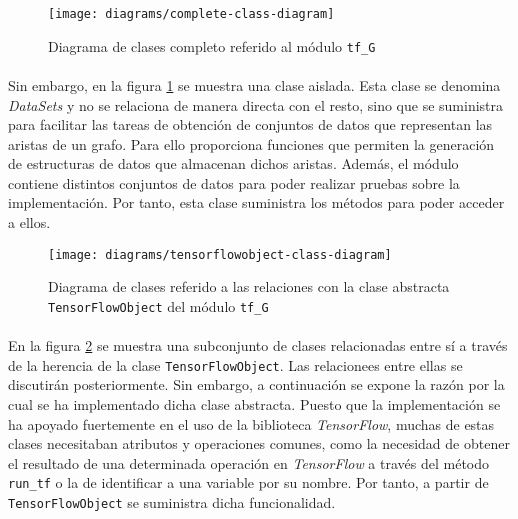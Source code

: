 \documentclass{subfiles}
\begin{document}
          \begin{figure}[h]
            \centering
            \texttt{[image: diagrams/complete-class-diagram]}
            \caption{Diagrama de clases completo referido al módulo \texttt{tf\_G}}
            \label{img:class_diagram}
          \end{figure}

          \paragraph{}
          Sin embargo, en la figura \ref{img:class_diagram} se muestra una clase aislada. Esta clase se denomina \emph{DataSets} y no se relaciona de manera directa con el resto, sino que se suministra para facilitar las tareas de obtención de conjuntos de datos que representan las aristas de un grafo. Para ello proporciona funciones que permiten la generación de estructuras de datos que almacenan dichos aristas. Además, el módulo contiene distintos conjuntos de datos para poder realizar pruebas sobre la implementación. Por tanto, esta clase suministra los métodos para poder acceder a ellos.

          \begin{figure}[h]
            \centering
            \texttt{[image: diagrams/tensorflowobject-class-diagram]}
            \caption{Diagrama de clases referido a las relaciones con la clase abstracta \texttt{TensorFlowObject} del módulo \texttt{tf\_G}}
            \label{img:tensorflowobject_class_diagram}
          \end{figure}

          \paragraph{}
          En la figura \ref{img:tensorflowobject_class_diagram} se muestra una subconjunto de clases relacionadas entre sí a través de la herencia de la clase \texttt{TensorFlowObject}. Las relacionees entre ellas se discutirán posteriormente. Sin embargo, a continuación se expone la razón por la cual se ha implementado dicha clase abstracta. Puesto que la implementación se ha apoyado fuertemente en el uso de la biblioteca \emph{TensorFlow}, muchas de estas clases necesitaban atributos y operaciones comunes, como la necesidad de obtener el resultado de una determinada operación en \emph{TensorFlow} a través del método \texttt{run\_tf} o la de identificar a una variable por su nombre. Por tanto, a partir de \texttt{TensorFlowObject} se suministra dicha funcionalidad.
\end{document}
